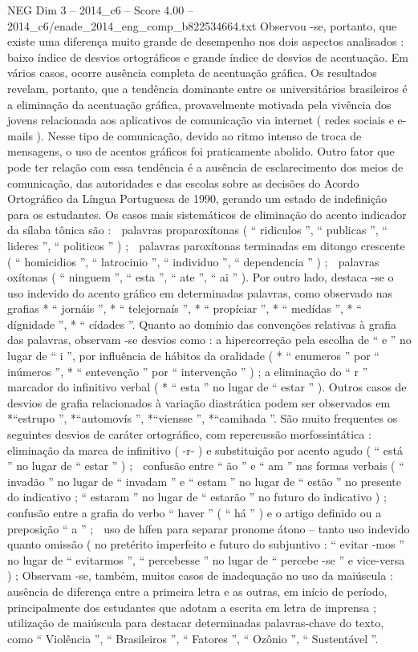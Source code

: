\begin{textsample}{NEG Dim 3 – 2014\_c6 – Score 4.00 – 2014\_c6/enade\_2014\_eng\_comp\_b822534664.txt}
Observou -se, portanto, que existe uma diferença muito grande de desempenho nos dois aspectos analisados : baixo índice de desvios ortográficos e grande índice de desvios de acentuação.
Em vários casos, ocorre ausência completa de acentuação gráfica.
Os resultados revelam, portanto, que a tendência dominante entre os universitários brasileiros é a eliminação da acentuação gráfica, provavelmente motivada pela vivência dos jovens relacionada aos aplicativos de comunicação via internet ( redes sociais e e-mails ).
Nesse tipo de comunicação, devido ao ritmo intenso de troca de mensagens, o uso de acentos gráficos foi praticamente abolido.
Outro fator que pode ter relação com essa tendência é a ausência de esclarecimento dos meios de comunicação, das autoridades e das escolas sobre as decisões do Acordo Ortográfico da Língua Portuguesa de 1990, gerando um estado de indefinição para os estudantes.
Os casos mais sistemáticos de eliminação do acento indicador da sílaba tônica são :  palavras proparoxítonas ( “ ridiculos ”, “ publicas ”, “ lideres ”, “ politicos ” ) ;  palavras paroxítonas terminadas em ditongo crescente ( “ homicidios ”, “ latrocinio ”, “ individuo ”, “ dependencia ” ) ;  palavras oxítonas ( “ ninguem ”, “ esta ”, “ ate ”, “ ai ” ).
Por outro lado, destaca -se o uso indevido do acento gráfico em determinadas palavras, como observado nas grafias * “ jornáis ”, * “ telejornaís ”, * “ propíciar ”, * “ medídas ”, * “ dígnidade ”, * “ cídades ”.
Quanto ao domínio das convenções relativas à grafia das palavras, observam -se desvios como : a hipercorreção pela escolha de “ e ” no lugar de “ i ”, por influência de hábitos da oralidade ( * “ enumeros ” por “ inúmeros ”, * “ entevenção ” por “ intervenção ” ) ; a eliminação do “ r ” marcador do infinitivo verbal ( * “ esta ” no lugar de “ estar ” ).
Outros casos de desvios de grafia relacionados à variação diastrática podem ser observados em *“estrupo ”, *“automovís ”, *“viensse ”, *“camihada ”.
São muito frequentes os seguintes desvios de caráter ortográfico, com repercussão morfossintática :  eliminação da marca de infinitivo ( -r- ) e substituição por acento agudo ( “ está ” no lugar de “ estar ” ) ;  confusão entre “ ão ” e “ am ” nas formas verbais ( “ invadão ” no lugar de “ invadam ” e “ estam ” no lugar de “ estão ” no presente do indicativo ; “ estaram ” no lugar de “ estarão ” no futuro do indicativo ) ;  confusão entre a grafia do verbo “ haver ” ( “ há ” ) e o artigo definido ou a preposição “ a ” ;  uso de hífen para separar pronome átono – tanto uso indevido quanto omissão ( no pretérito imperfeito e futuro do subjuntivo : “ evitar -mos ” no lugar de “ evitarmos ”, “ percebesse ” no lugar de “ percebe -se ” e vice-versa ) ; Observam -se, também, muitos casos de inadequação no uso da maiúscula : ausência de diferença entre a primeira letra e as outras, em início de período, principalmente dos estudantes que adotam a escrita em letra de imprensa ; utilização de maiúscula para destacar determinadas palavras-chave do texto, como “ Violência ”, “ Brasileiros ”, “ Fatores ”, “ Ozônio ”, “ Sustentável ”.

\end{textsample}
